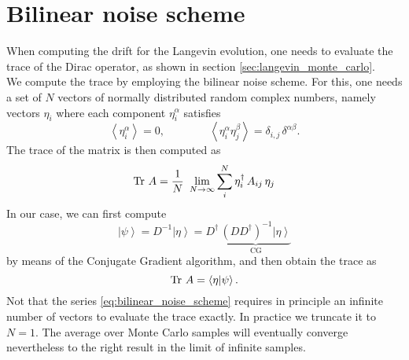 \section*{Bilinear noise scheme}
When computing the drift for the Langevin evolution, one needs to evaluate the trace of the Dirac operator, as shown in section \ref{sec:langevin_monte_carlo}. \\
We compute the trace by employing the bilinear noise scheme. For this, one needs a set of $N$ vectors of normally distributed random complex numbers, namely vectors $\eta_i$ where each component $\eta_i^\alpha$ satisfies
\begin{equation*}
    \left\langle \eta_i^{\alpha} \right\rangle = 0, \qquad\qquad \left\langle \eta_i^{\alpha}\eta_j^{\beta} \right\rangle = \delta_{i,j} \, \delta^{\alpha \beta}.
\end{equation*}
The trace of the matrix is then computed as 
\begin{equation}
    \operatorname{\text{Tr} \,} {A} = \frac{1}{N} \ \lim_{N \to \infty} \sum_i^N \eta_i^{\dagger} \, A_{ij} \, \eta_j
    \label{eq:bilinear_noise_scheme}
\end{equation}
In our case, we can first compute
\begin{equation*}
    \left| \psi \right\rangle = D^{-1} \left| \eta \right\rangle = D^\dagger \, \underbrace{(D D^\dagger)^{-1} \left| \eta \right\rangle}_{\text{CG}}
\end{equation*}
by means of the Conjugate Gradient algorithm, and then obtain the trace as 
\begin{equation*}
    \operatorname{\text{Tr} \,} {A} = \left\langle \eta | \psi \right\rangle.
\end{equation*}
Not that the series \eqref{eq:bilinear_noise_scheme} requires in principle an infinite number of vectors to evaluate the trace exactly. In practice we truncate it to $N=1$. The average over Monte Carlo samples will eventually converge nevertheless to the right result in the limit of infinite samples. \\~\\

